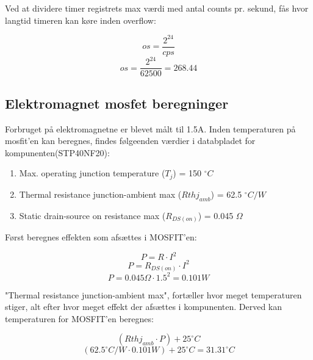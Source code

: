 Ved at dividere timer registrets max værdi med antal counts pr. sekund, fås hvor langtid timeren kan køre inden overflow:

$$os = \frac{2^{24}}{cps}$$
$$os = \frac{2^{24}}{62500} = 268.44$$

\subsection{Elektromagnet mosfet beregninger}
\label{subsec:mosfet}
Forbruget på elektromagnetne er blevet målt til 1.5A. Inden temperaturen på mosfit'en kan beregnes, findes følgeenden værdier i databpladet for kompunenten(STP40NF20):
\begin{enumerate}
\item Max. operating junction temperature ($T_j$) = 150 $^\circ C$
\item Thermal resistance junction-ambient max ($Rthj_{amb}$) = 62.5 $^\circ C/W$
\item Static drain-source on resistance max ($R_{DS(on)}$) = 0.045 $\Omega$
\end{enumerate}
Først beregnes effekten som afsættes i MOSFIT'en:

$$P = R \cdot I^2$$
$$P = R_{DS(on)} \cdot I^2$$
$$P = 0.045 \Omega \cdot 1.5^2 = 0.101 W$$

"Thermal resistance junction-ambient max", fortæller hvor meget temperaturen stiger, alt efter hvor meget effekt der afsættes i kompunenten. Derved kan temperaturen for MOSFIT'en beregnes:

$$(Rthj_{amb} \cdot P) + 25^\circ C$$
$$(62.5^\circ C/W  \cdot 0.101 W) + 25^\circ C = 31.31 ^\circ C$$

